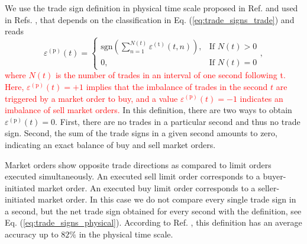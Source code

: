 We use the trade sign definition in physical time scale proposed in Ref.
\cite{Wang_2016_cross} and used in Refs.
\cite{Wang_2016_avg,Wang_2017}, that depends on the classification in
Eq. (\ref{eq:trade_signs_trade}) and reads
\begin{equation}\label{eq:trade_signs_physical}
    \varepsilon^{\left(\textrm{p}\right)}\left(t\right)=\left\{
    \begin{array}{cc}
    \text{sgn}\left(\sum_{n=1}^{N\left(t\right)}
    \varepsilon^{\left(\textrm{t}\right)} \left(t,n\right)\right),
    & \text{If }N \left(t\right)>0\\
    0, & \text{If }N\left(t\right)=0
    \end{array}\right. ,
\end{equation}
\textcolor{red}{where $N \left(t \right)$ is the number of trades in an interval of one second following t.}
\textcolor{red}{Here, $\varepsilon^{\left(\textrm{p}\right)}\left( t \right) = +1$ implies that
the imbalance of trades in the second $t$ are triggered by a market order to buy,
and a value $\varepsilon^{\left(\textrm{p}\right)}\left( t \right) = -1$
indicates an imbalance of sell market orders.} In this definition, there are two
ways to obtain $\varepsilon^{\left(\textrm{p}\right)}\left( t \right) = 0$.
First, there are no trades in a particular second and thus no trade sign.
Second, the sum of the trade signs in a given second amounts to zero,
indicating an exact balance of buy and sell market orders.

Market orders show opposite trade directions as compared to limit orders
executed simultaneously. An executed sell limit order corresponds to a
buyer-initiated market order. An executed buy limit order corresponds to a
seller-initiated market order. In this case we do not compare every single
trade sign in a second, but the net trade sign obtained for every second with
the definition, see Eq. (\ref{eq:trade_signs_physical}). According to Ref.
\cite{Wang_2016_cross}, this definition has an average accuracy up to $82\%$ in
the physical time scale.
